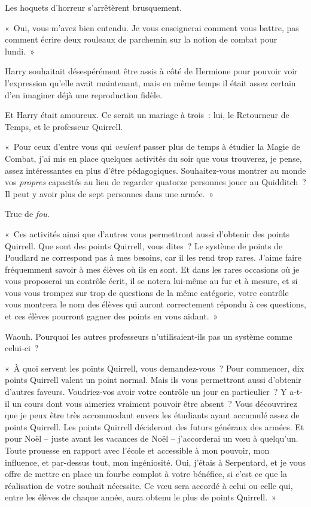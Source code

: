 Les hoquets d'horreur s'arrêtèrent brusquement.

«~Oui, vous m'avez bien entendu. Je vous enseignerai comment vous battre, pas comment écrire deux rouleaux de parchemin sur la notion de combat pour lundi.~»

Harry souhaitait désespérément être assis à côté de Hermione pour pouvoir voir l'expression qu'elle avait maintenant, mais en même temps il était assez certain d'en imaginer déjà une reproduction fidèle.

Et Harry était amoureux. Ce serait un mariage à trois~: lui, le Retourneur de Temps, et le professeur Quirrell.

«~Pour ceux d'entre vous qui \emph{veulent} passer plus de temps à étudier la Magie de Combat, j'ai mis en place quelques activités du soir que vous trouverez, je pense, assez intéressantes en plus d'être pédagogiques. Souhaitez-vous montrer au monde vos \emph{propres} capacités au lieu de regarder quatorze personnes jouer au Quidditch~? Il peut y avoir plus de sept personnes dans une armée.~»

Truc de \emph{fou}.

«~Ces activités ainsi que d'autres vous permettront aussi d'obtenir des points Quirrell. Que sont des points Quirrell, vous dites~? Le système de points de Poudlard ne correspond pas à mes besoins, car il les rend trop rares. J'aime faire fréquemment savoir à mes élèves où ils en sont. Et dans les rares occasions où je vous proposerai un contrôle écrit, il se notera lui-même au fur et à mesure, et si vous vous trompez sur trop de questions de la même catégorie, votre contrôle vous montrera le nom des élèves qui auront correctement répondu à ces questions, et ces élèves pourront gagner des points en vous aidant.~»

Waouh. Pourquoi les autres professeurs n'utilisaient-ils pas un système comme celui-ci~?

«~À quoi servent les points Quirrell, vous demandez-vous~? Pour commencer, dix points Quirrell valent un point normal. Mais ils vous permettront aussi d'obtenir d'autres faveurs. Voudriez-vos avoir votre contrôle un jour en particulier~? Y a-t-il un cours dont vous aimeriez vraiment pouvoir être absent~? Vous découvrirez que je peux être très accommodant envers les étudiants ayant accumulé assez de points Quirrell. Les points Quirrell décideront des futurs généraux des armées. Et pour Noël -- juste avant les vacances de Noël -- j'accorderai un vœu à quelqu'un. Toute prouesse en rapport avec l'école et accessible à mon pouvoir, mon influence, et par-dessus tout, mon ingéniosité. Oui, j'étais à Serpentard, et je vous offre de mettre en place un fourbe complot à votre bénéfice, si c'est ce que la réalisation de votre souhait nécessite. Ce vœu sera accordé à celui ou celle qui, entre les élèves de chaque année, aura obtenu le plus de points Quirrell.~»

